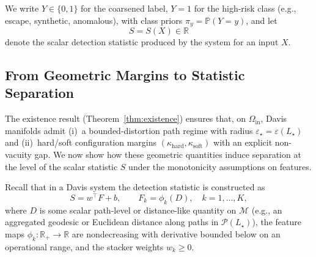 \documentclass[11pt]{article}
\newcommand{\Prob}{\mathbb{P}}
\theoremstyle{remark}
\theoremstyle{plain}
\begin{document}
We write $Y \in \{0,1\}$ for the coarsened label, $Y=1$ for the high-risk class (e.g., escape,
synthetic, anomalous), with class priors $\pi_y = \Prob(Y=y)$, and let
\[
S = S(X) \in \mathbb{R}
\]
denote the scalar detection statistic produced by the system for an input $X$.

\subsection{From Geometric Margins to Statistic Separation}

The existence result (Theorem~\ref{thm:existence}) ensures that, on $\Omega_{\mathrm{in}}$, Davis
manifolds admit (i)~a bounded-distortion path regime with radius $\varepsilon_\star = \varepsilon(L_\star)$
and (ii)~hard/soft configuration margins $(\kappa_{\mathrm{hard}}, \kappa_{\mathrm{soft}})$ with an
explicit non-vacuity gap. We now show how these geometric quantities induce separation at the
level of the scalar statistic $S$ under the monotonicity assumptions on features.

Recall that in a Davis system the detection statistic is constructed as
\[
S = w^\top F + b,\qquad F_k = \phi_k(D),\quad k=1,\dots,K,
\]
where $D$ is some scalar path-level or distance-like quantity on $\mathcal{M}$ (e.g., an aggregated
geodesic or Euclidean distance along paths in $\mathcal{P}(L_\star)$), the feature maps
$\phi_k : \mathbb{R}_+ \to \mathbb{R}$ are nondecreasing with derivative bounded below on an
operational range, and the stacker weights $w_k \ge 0$.
\end{document}
